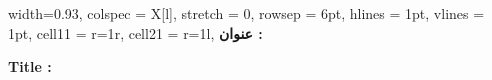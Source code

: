 \begin{table}[H]
	\label{Segment: 3}
	\begin{tblr}{
			width=0.93\textwidth,
			colspec = {X[l]},
			stretch = 0,
			rowsep = 6pt,
			hlines = {1pt},
			vlines = {1pt},
			cell{1}{1} = {r=1}{r},
			cell{2}{1} = {r=1}{l},
		}
	    \textbf{عنوان :}
		\TitleFarsi
		\\
		\begin{latin}
			\justifying
			\noindent
			\textbf{Title :}
			\TitleEnglish
	    \end{latin}	
	    
		\\	
	\end{tblr}
\end{table}
